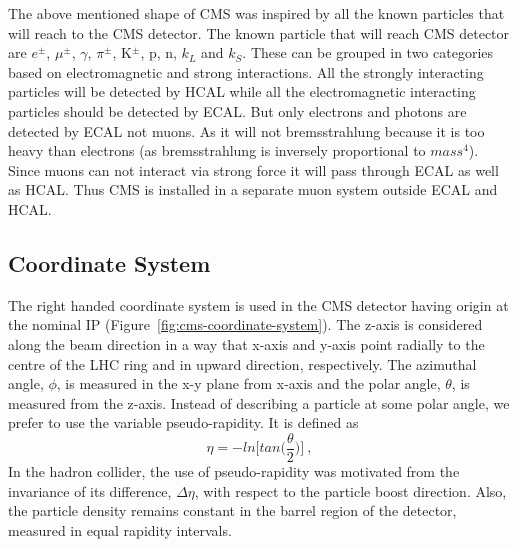 The above mentioned shape of CMS was inspired by all the known particles that will reach to the CMS detector.
The known particle that will reach CMS detector are $e^{\pm}$, $\mu^{\pm}$, $\gamma$, $\pi^{\pm}$, K$^{\pm}$, p, n, $k_{L}$ and $k_{S}$.
These can be grouped in two categories based on electromagnetic and strong interactions.
All the strongly interacting particles will be detected by HCAL while all the electromagnetic interacting particles should be detected by ECAL.
But only electrons and photons are detected by ECAL not muons.
As it will not bremsstrahlung because it is too heavy than electrons (as bremsstrahlung is inversely proportional to $mass^4$).
Since muons can not interact via strong force it will pass through ECAL as well as HCAL.
Thus CMS is installed in a separate muon system outside ECAL and HCAL.

\subsection{Coordinate System} %
\label{sub:coordinate_system}
The right handed coordinate system is used in the CMS detector having origin at the nominal IP (Figure~\ref{fig:cms-coordinate-system}). The z-axis is considered along the beam direction in a way that x-axis and y-axis point radially to the centre of the LHC ring and in upward direction, respectively. The azimuthal angle, $\phi$, is measured in the x-y plane from x-axis and the polar angle, $\theta$, is measured from the z-axis. Instead of describing a particle at some polar angle, we prefer to use the variable pseudo-rapidity. It is defined as 
\begin{equation}
	\eta = -ln\bigg[tan\Big(\frac{\theta}{2}\Big)\bigg]~,
\end{equation}
In the hadron collider, the use of pseudo-rapidity was motivated from the invariance of its difference, $\Delta \eta$, with respect to the particle boost direction. Also, the particle density remains constant in the barrel region of the detector, measured in equal rapidity intervals.


